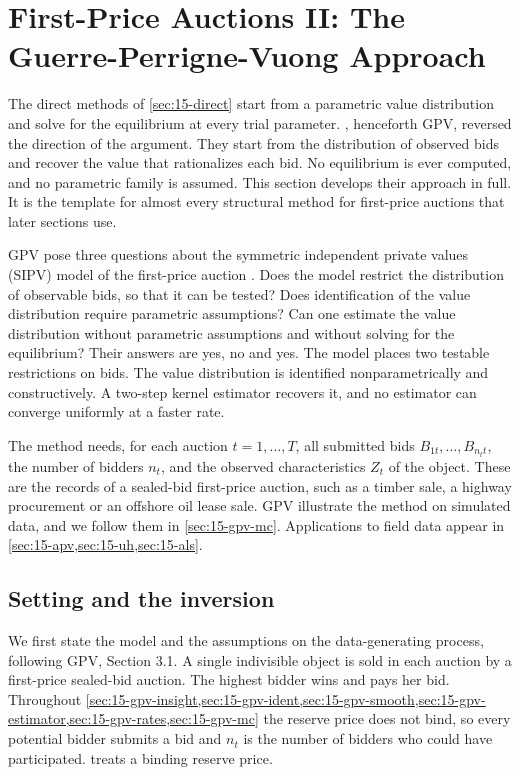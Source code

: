\section{First-Price Auctions II: The Guerre-Perrigne-Vuong Approach}\label{sec:15-gpv}

The direct methods of \cref{sec:15-direct} start from a parametric value distribution and solve for the equilibrium at every trial parameter. \citet{GuerrePerrigneVuong2000}, henceforth GPV, reversed the direction of the argument. They start from the distribution of observed bids and recover the value that rationalizes each bid. No equilibrium is ever computed, and no parametric family is assumed. This section develops their approach in full. It is the template for almost every structural method for first-price auctions that later sections use.

 GPV pose three questions about the symmetric independent private values (SIPV) model of the first-price auction \citep[p.~526]{GuerrePerrigneVuong2000}. Does the model restrict the distribution of observable bids, so that it can be tested? Does identification of the value distribution require parametric assumptions? Can one estimate the value distribution without parametric assumptions and without solving for the equilibrium? Their answers are yes, no and yes. The model places two testable restrictions on bids. The value distribution is identified nonparametrically and constructively. A two-step kernel estimator recovers it, and no estimator can converge uniformly at a faster rate.

 The method needs, for each auction $t=1,\dots,T$, all submitted bids $B_{1t},\dots,B_{n_tt}$, the number of bidders $n_t$, and the observed characteristics $Z_t$ of the object. These are the records of a sealed-bid first-price auction, such as a timber sale, a highway procurement or an offshore oil lease sale. GPV illustrate the method on simulated data, and we follow them in \cref{sec:15-gpv-mc}. Applications to field data appear in \cref{sec:15-apv,sec:15-uh,sec:15-als}.

\subsection{Setting and the inversion}\label{sec:15-gpv-insight}

We first state the model and the assumptions on the data-generating process, following GPV, Section 3.1. A single indivisible object is sold in each auction by a first-price sealed-bid auction. The highest bidder wins and pays her bid. Throughout \cref{sec:15-gpv-insight,sec:15-gpv-ident,sec:15-gpv-smooth,sec:15-gpv-estimator,sec:15-gpv-rates,sec:15-gpv-mc} the reserve price does not bind, so every potential bidder submits a bid and $n_t$ is the number of bidders who could have participated.  treats a binding reserve price.

